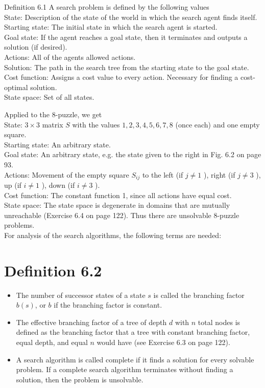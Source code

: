 \documentclass[10pt]{article}
\begin{document}
Definition 6.1 A search problem is defined by the following values\\
State: Description of the state of the world in which the search agent finds itself.\\
Starting state: The initial state in which the search agent is started.\\
Goal state: If the agent reaches a goal state, then it terminates and outputs a solution (if desired).\\
Actions: All of the agents allowed actions.\\
Solution: The path in the search tree from the starting state to the goal state.\\
Cost function: Assigns a cost value to every action. Necessary for finding a cost-optimal solution.\\
State space: Set of all states.

Applied to the 8-puzzle, we get\\
State: $3 \times 3$ matrix $S$ with the values $1,2,3,4,5,6,7,8$ (once each) and one empty square.\\
Starting state: An arbitrary state.\\
Goal state: An arbitrary state, e.g. the state given to the right in Fig. 6.2 on page 93.\\
Actions: Movement of the empty square $S_{i j}$ to the left (if $j \neq 1$ ), right (if $j \neq 3$ ), up (if $i \neq 1$ ), down (if $i \neq 3$ ).\\
Cost function: The constant function 1, since all actions have equal cost.\\
State space: The state space is degenerate in domains that are mutually unreachable (Exercise 6.4 on page 122). Thus there are unsolvable 8-puzzle problems.\\
For analysis of the search algorithms, the following terms are needed:

\section*{Definition 6.2}
\begin{itemize}
  \item The number of successor states of a state $s$ is called the branching factor $b(s)$, or $b$ if the branching factor is constant.
  \item The effective branching factor of a tree of depth $d$ with $n$ total nodes is defined as the branching factor that a tree with constant branching factor, equal depth, and equal $n$ would have (see Exercise 6.3 on page 122).
  \item A search algorithm is called complete if it finds a solution for every solvable problem. If a complete search algorithm terminates without finding a solution, then the problem is unsolvable.
\end{itemize}
\end{document}
